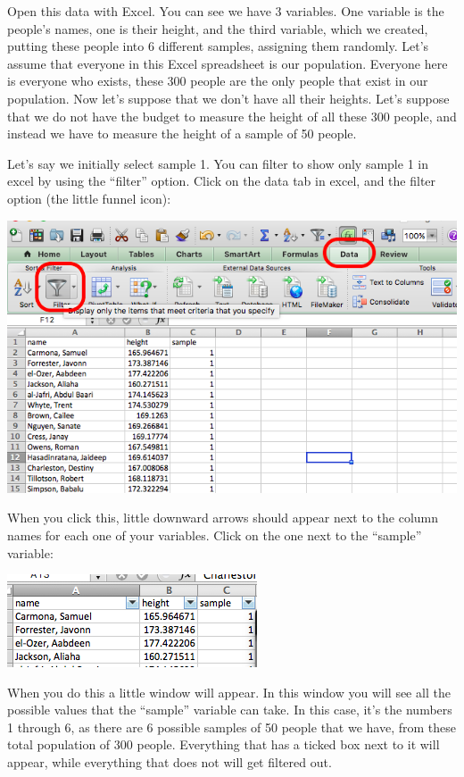 \documentclass[
]{book}
\begin{document}
Open this data with Excel. You can see we have 3 variables. One variable is the people's names, one is their height, and the third variable, which we created, putting these people into 6 different samples, assigning them randomly. Let's assume that everyone in this Excel spreadsheet is our population. Everyone here is everyone who exists, these 300 people are the only people that exist in our population. Now let's suppose that we don't have all their heights. Let's suppose that we do not have the budget to measure the height of all these 300 people, and instead we have to measure the height of a sample of 50 people.

Let's say we initially select sample 1. You can filter to show only sample 1 in excel by using the ``filter'' option. Click on the data tab in excel, and the filter option (the little funnel icon):

\includegraphics{imgs/filter_data.png}

When you click this, little downward arrows should appear next to the column names for each one of your variables. Click on the one next to the ``sample'' variable:

\includegraphics{imgs/filter_arrows.png}

When you do this a little window will appear. In this window you will see all the possible values that the ``sample'' variable can take. In this case, it's the numbers 1 through 6, as there are 6 possible samples of 50 people that we have, from these total population of 300 people. Everything that has a ticked box next to it will appear, while everything that does not will get filtered out.
\end{document}
